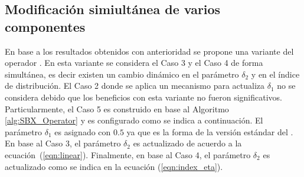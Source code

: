 \subsection{Modificación simiultánea de varios componentes}

En base a los resultados obtenidos con anterioridad se propone una variante del operador \SBX{}.
%
En esta variante se considera el Caso 3 y el Caso 4 de forma simultánea, es decir existen un cambio dinámico en el parámetro $\delta_2$ y en el índice de distribución.
%
El Caso 2 donde se aplica un mecanismo para actualiza $\delta_1$ no se considera debido que los beneficios con esta variante no fueron significativos.
%
Particularmente, el Caso 5 es construido en base al Algoritmo \ref{alg:SBX_Operator} y es configurado como se indica a continuación.
%
El parámetro $\delta_1$ es asignado con $0.5$ ya que es la forma de la versión estándar del \SBX{}.
%
En base al Caso 3, el parámetro $\delta_2$ es actualizado de acuerdo a la ecuación~(\ref{eqn:linear}).
%
Finalmente, en base al Caso 4, el parámetro $\delta_2$ es actualizado como se indica en la ecuación (\ref{eqn:index_eta}).

